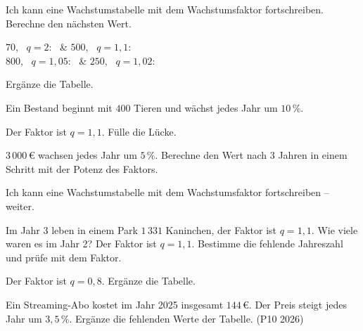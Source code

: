 \begin{aufgabe}{Ich kann eine Wachstumstabelle mit dem Wachstumsfaktor fortschreiben. Berechne den nächsten Wert.}
\begin{teilezwei}
\tz $70$, \ $q = 2$: \ \leerfeld & \tz $500$, \ $q = 1{,}1$: \ \leerfeld \\
\tz $800$, \ $q = 1{,}05$: \ \leerfeld & \tz $250$, \ $q = 1{,}02$: \ \leerfeld \\
\end{teilezwei}
Ergänze die Tabelle.
\begin{teile}
\teil Ein Bestand beginnt mit $400$ Tieren und wächst jedes Jahr um $10\,\%$.
\end{teile}
\begin{teile}
\teil Der Faktor ist $q = 1{,}1$. Fülle die Lücke.
\end{teile}
\begin{teile}
\teil $3\,000\,€$ wachsen jedes Jahr um $5\,\%$. Berechne den Wert nach $3$ Jahren in einem Schritt mit der Potenz des Faktors. \quad \leerfeld[€]
\end{teile}
\end{aufgabe}

\begin{aufgabe}{Ich kann eine Wachstumstabelle mit dem Wachstumsfaktor fortschreiben – weiter.}
\begin{teile}
\teil Im Jahr 3 leben in einem Park $1\,331$ Kaninchen, der Faktor ist $q = 1{,}1$. Wie viele waren es im Jahr 2? \quad \leerfeld
\teil Der Faktor ist $q = 1{,}1$. Bestimme die fehlende Jahreszahl und prüfe mit dem Faktor.
\end{teile}
\begin{teile}
\teil Der Faktor ist $q = 0{,}8$. Ergänze die Tabelle.
\end{teile}
\begin{teile}
\teil Ein Streaming-Abo kostet im Jahr 2025 insgesamt $144\,€$. Der Preis steigt jedes Jahr um $3{,}5\,\%$. Ergänze die fehlenden Werte der Tabelle. (P10 2026)
\end{teile}
\end{aufgabe}

